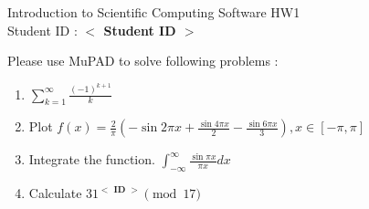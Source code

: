 \documentclass[12pt,a4paper]{article}
\newcommand{\placeholder}[1]{\textbf{$<$ #1 $>$}}
\newcommand{\idnumber}{\placeholder{Student ID}}
\newcommand{\moodleid}{\placeholder{ID}}
\begin{document}
\begin{flushleft}Introduction to Scientific Computing Software HW1
\\Student ID : \idnumber{}\end{flushleft}

Please use MuPAD to solve following problems : 
\begin{enumerate}
\item 
$\displaystyle{\sum^\infty_{k=1}\frac{(-1)^{k+1}}{k}}$

\item Plot
$\displaystyle{f(x)=\frac{2}{\pi}\left(-\sin 2\pi x+\frac{\sin 4\pi x}{2}-\frac{\sin 6\pi x}{3}\right)},x\in[-\pi,\pi]$

\item Integrate the function. $\displaystyle{\int^\infty_{-\infty}\frac{\sin \pi x}{\pi x}dx}$

\item Calculate $31^{\moodleid}\pmod{17}$

\end{enumerate}
\end{document}
